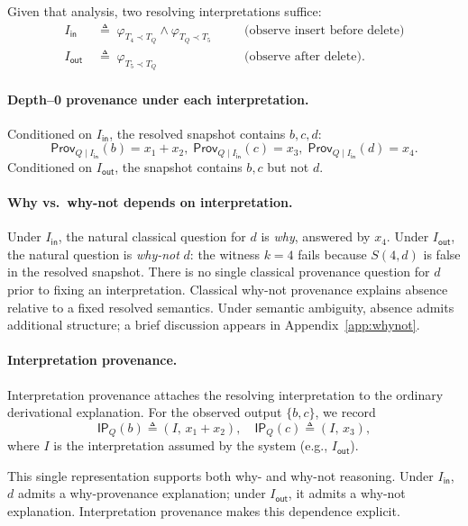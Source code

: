 \documentclass[acmsmall,nonacm]{acmart}
\theoremstyle{remark}
\numberwithin{definition}{section}
\numberwithin{theorem}{section}
\numberwithin{lemma}{section}
\numberwithin{corollary}{section}
\numberwithin{remark}{section}
\numberwithin{example}{section}
\numberwithin{observation}{section}
\numberwithin{assumption}{section}
\newcommand{\Prov}{\mathsf{Prov}}
\begin{document}
Given that analysis, two resolving interpretations suffice:
\[
\begin{aligned}
  I_{\mathsf{in}} &\;\triangleq\; \varphi_{T_4 \prec T_Q} \wedge \varphi_{T_Q \prec T_5} &&\quad\text{(observe insert before delete)}\\
  I_{\mathsf{out}} &\;\triangleq\; \varphi_{T_5 \prec T_Q} &&\quad\text{(observe after delete).}
\end{aligned}
\]

\paragraph{Depth--0 provenance under each interpretation.}
Conditioned on $I_{\mathsf{in}}$, the resolved snapshot contains $b,c,d$:
\[
  \Prov_{Q \mid I_{\mathsf{in}}}(b)=x_1+x_2,\;
  \Prov_{Q \mid I_{\mathsf{in}}}(c)=x_3,\;
  \Prov_{Q \mid I_{\mathsf{in}}}(d)=x_4.
\]
Conditioned on $I_{\mathsf{out}}$, the snapshot contains $b,c$ but not $d$.

\paragraph{Why vs.\ why-not depends on interpretation.}
Under $I_{\mathsf{in}}$, the natural classical question for $d$ is \emph{why},
answered by $x_4$.
Under $I_{\mathsf{out}}$, the natural question is \emph{why-not} $d$: the witness
$k=4$ fails because $S(4,d)$ is false in the resolved snapshot.
There is no single classical provenance question for $d$ prior to fixing an
interpretation. Classical why-not provenance explains absence relative to a fixed resolved
semantics.
Under semantic ambiguity, absence admits additional structure; a brief discussion
appears in Appendix~\ref{app:whynot}.

\paragraph{Interpretation provenance.}
Interpretation provenance attaches the resolving interpretation to the ordinary
derivational explanation.
For the observed output $\{b,c\}$, we record
\[
  \mathsf{IP}_Q(b)\triangleq (I,\, x_1+x_2),\quad
  \mathsf{IP}_Q(c)\triangleq (I,\, x_3),
\]
where $I$ is the interpretation assumed by the system (e.g., $I_{\mathsf{out}}$).

This single representation supports both why- and why-not reasoning.
Under $I_{\mathsf{in}}$, $d$ admits a why-provenance explanation; under
$I_{\mathsf{out}}$, it admits a why-not explanation.
Interpretation provenance makes this dependence explicit.
\end{document}

